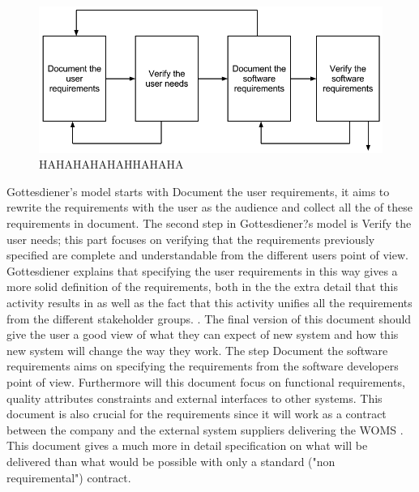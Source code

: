 \documentclass[a4paper]{article}
\begin{document}
\begin{figure}[H]
	\centering
		\includegraphics[width=1\textwidth]{images/specifications_model.png}
	\caption{HAHAHAHAHAHHAHAHA}
	\label{figure:specifications}
\end{figure}

Gottesdiener's model starts with Document the user requirements, it aims to rewrite the requirements with the user as the audience and collect all the of these requirements in document. The second step in Gottesdiener?s model is Verify the user needs; this part focuses on verifying that the requirements previously specified are complete and understandable from the different users point of view. Gottesdiener explains that specifying the user requirements in this way gives a more solid definition of the requirements, both in the the extra detail that this activity results in as well as the fact that this activity unifies all the requirements from the different stakeholder groups. \cite{gott234}. The final version of this document should give the user a good view of what they can expect of new system and how this new system will change the way they work\cite{gott235}. The step Document the software requirements aims on specifying the requirements from the software developers point of view. Furthermore will this document focus on functional requirements, quality attributes constraints and external interfaces to other systems\cite{gott238}. This document is also crucial for the requirements since it will work as a contract between the company and the external system suppliers delivering the WOMS \cite{gott238}. This document gives a much more in detail specification on what will be delivered than what would be possible with only a standard ("non requiremental") contract. 
\end{document}
